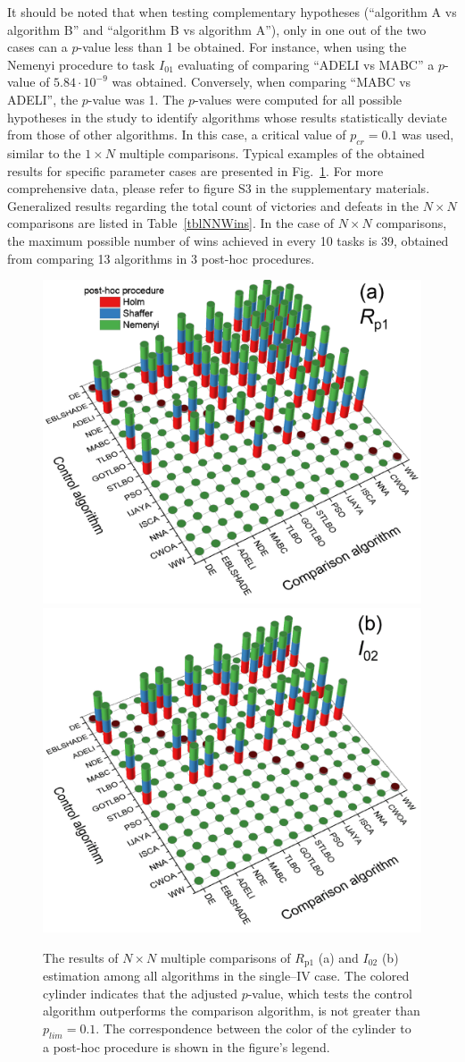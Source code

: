 \documentclass[a4paper,fleqn]{cas-dc}
\begin{document}
It should be noted that when testing complementary hypotheses
(``algorithm A vs algorithm B'' and ``algorithm B vs algorithm A''),
only in one out of the two cases can a $p$-value less than 1 be obtained.
For instance, when using the Nemenyi procedure to task $I_{01}$ evaluating of comparing ``ADELI vs MABC''
a $p$-value of $5.84\cdot10^{-9}$ was obtained.
Conversely, when comparing ``MABC vs ADELI'', the $p$-value was 1.
The $p$-values were computed for all possible hypotheses in the study to identify algorithms whose results statistically deviate from those of other algorithms.
In this case, a critical value of $p_{cr}=0.1$ was used, similar to the $1\times N$ multiple comparisons.
Typical examples of the obtained results for specific parameter cases are presented in Fig.~\ref{figNNRezSingleIV}.
For more comprehensive data, please refer to figure S3 in the supplementary materials.
Generalized results regarding the total count of victories and defeats in the $N\times N$ comparisons are listed in Table~\ref{tblNNWins}.
In the case of $N\times N$ comparisons, the maximum possible number of wins achieved in every 10 tasks is 39,
obtained from comparing 13 algorithms in 3 post-hoc procedures.

\begin{figure}[!ht]
	\centering
		\includegraphics[width=.49\textwidth]{Rp1shot_NN}
        \includegraphics[width=.49\textwidth]{I02shot_NN}
	  \caption{The results of $N\times N$ multiple comparisons of $R_\mathrm{p1}$ (a) and $I_{02}$ (b) estimation
               among all algorithms in the single--IV case.
               The colored cylinder indicates that the adjusted $p$-value,
               which tests the control algorithm outperforms the comparison algorithm,
               is not greater than $p_{lim}=0.1$.
               The correspondence between the color of the cylinder to a post-hoc procedure is shown in the figure's legend.
               }\label{figNNRezSingleIV}
\end{figure}
\end{document}

